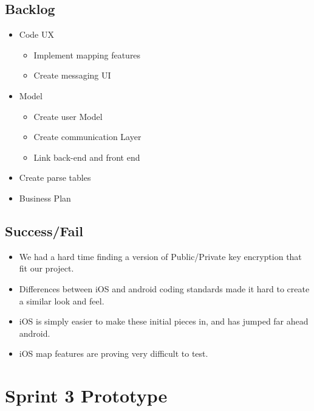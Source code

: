\subsection{Backlog}
\begin{itemize}
	\item Code UX
	\begin{itemize}
		\item Implement mapping features
		\item Create messaging UI
	\end{itemize}
	\item Model
	\begin{itemize}
		\item Create user Model
		\item Create communication Layer
		\item Link back-end and front end
	\end{itemize}
	\item Create parse tables
	\item Business Plan
\end{itemize}
\subsection{Success/Fail}
\begin{itemize}
	\item We had a hard time finding a version of Public/Private key encryption that fit our project.
	\item Differences between iOS and android coding standards made it hard to create a similar look and feel.
	\item iOS is simply easier to make these initial pieces in, and has jumped far ahead android.
	\item iOS map features are proving very difficult to test.
\end{itemize}

\section{Sprint 3 Prototype}


